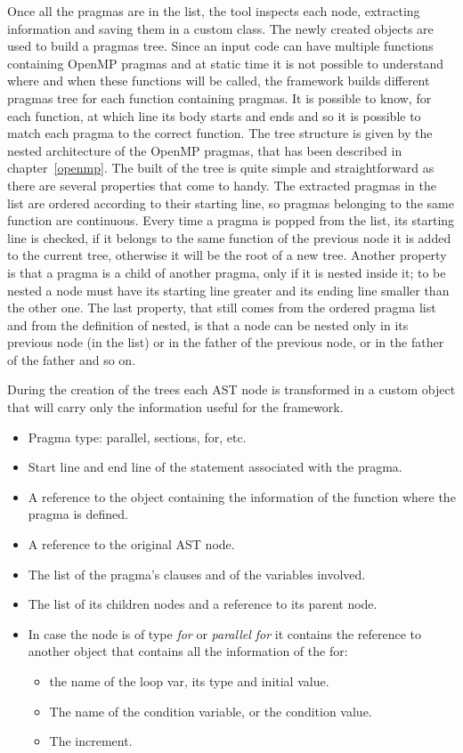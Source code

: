 \documentclass[a4paper,11pt,oneside]{book}
\begin{document}
Once all the pragmas are in the list, the tool inspects each node, extracting information and saving them in a custom class. The newly created objects are used to build a pragmas tree. Since an input code can have multiple functions containing OpenMP pragmas and at static time it is not possible to understand where and when these functions will be called, the framework builds different pragmas tree for each function containing pragmas. It is possible to know, for each function, at which line its body starts and ends and so it is possible to match each pragma to the correct function. The tree structure is given by the nested architecture of the OpenMP pragmas, that has been described in chapter~\ref{openmp}. The built of the tree is quite simple and straightforward as there are several properties that come to handy. The extracted pragmas in the list are ordered according to their starting line, so pragmas belonging to the same function are continuous. Every time a pragma is popped from the list, its starting line is checked, if it belongs to the same function of the previous node it is added to the current tree, otherwise it will be the root of a new tree. Another property is that a pragma is a child of another pragma, only if it is nested inside it; to be nested a node must have its starting line greater and its ending line smaller than the other one.  The last property, that still comes from the ordered pragma list and from the definition of nested, is that a node can be nested only in its previous node (in the list) or in the father of the previous node, or in the father of the father and so on.

During the creation of the trees each AST node is transformed in a custom object that will carry only the information useful for the framework. 

\begin{itemize}
\item Pragma type: parallel, sections, for, etc.
\item Start line and end line of the statement associated with the pragma.
\item A reference to the object containing the information of the function where the pragma is defined.
\item A reference to the original AST node.
\item The list of the pragma’s clauses and of the variables involved. 
\item The list of its children nodes and a reference to its parent node.
\item In case the node is of type \emph{for} or \emph{parallel for} it contains the reference to another object that contains all the information of the for:
\begin{itemize}
\item the name of the loop var, its type and initial value.
\item The name of the condition variable, or the condition value.
\item The increment.
\end{itemize}
\end{itemize}
\end{document}
